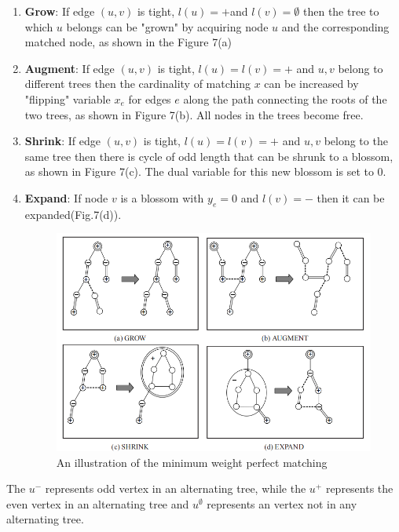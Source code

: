 \documentclass[
    a4paper, %
    10pt, %
    unnumberedsections, %
    twoside, %
]{LTJournalArticle}
\begin{document}
\begin{enumerate}
    \item \textbf{Grow}: If edge $(u,v)$ is tight, $l(u) = + $and $l(v) = \emptyset$ then the tree to which $u$ belongs can be "grown" by acquiring node $u$ and the corresponding matched node, as shown in the Figure 7(a)
    \item \textbf{Augment}: If edge $(u,v) $ is tight, $l(u) = l(v) = + $ and $u,v$ belong to different trees then the cardinality of matching $x$ can be increased by "flipping" variable $x_e$ for edges $e$ along the path connecting the roots of the two trees, as shown in Figure 7(b). All nodes in the trees become free.
    \item \textbf{Shrink}: If edge $(u,v) $ is tight, $l(u) = l(v) = + $ and $u,v$ belong to the same tree then there is cycle of odd length that can be shrunk to a blossom, as shown in Figure 7(c). The dual variable for this new blossom is set to 0.
    \item \textbf{Expand}: If node $v$ is a blossom with $y_e = 0$ and $l(v) = -$ then it can be expanded(Fig.7(d)).
\begin{figure} %
    \setlength{\abovecaptionskip}{0.cm} %
    \setlength{\abovecaptionskip}{0.cm} 
    \includegraphics[width=\linewidth]{img/minimum weight.png}
    \caption{An illustration of the minimum weight perfect matching}
\end{figure}
\end{enumerate}
    The $u^-$ represents odd vertex in an alternating tree, while the $u^+$ represents the even vertex in an alternating tree and $u^{\emptyset}$ represents an vertex not in any alternating tree.
\end{document}
